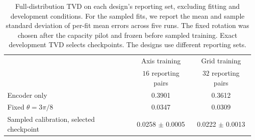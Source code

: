 \begin{table}[!t]
\caption{Full-distribution TVD on each design's reporting set, excluding fitting and development conditions. For the sampled fits, we report the mean and sample standard deviation of per-fit mean errors across five runs. The fixed rotation was chosen after the capacity pilot and frozen before sampled training. Exact development TVD selects checkpoints. The designs use different reporting sets.}
\label{tab:gaussian-two-dimensional}
\centering
\begin{tabular}{lcc}\toprule
 & Axis training & Grid training\\
 & $16$ reporting pairs & $32$ reporting pairs\\\midrule
Encoder only & 0.3901 & 0.3612\\
Fixed $\theta=3\pi/8$ & 0.0347 & 0.0309\\
Sampled calibration, selected checkpoint & 0.0258 $\pm$ 0.0005 & 0.0222 $\pm$ 0.0013\\
\bottomrule
\end{tabular}
\end{table}

